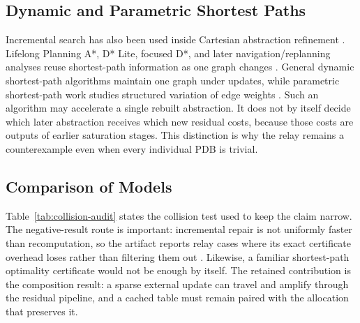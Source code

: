 \subsection{Dynamic and Parametric Shortest Paths}
Incremental search has also been used inside Cartesian abstraction refinement \citep{incremental2020}. Lifelong Planning A*, D* Lite, focused D*, and later navigation/replanning analyses reuse shortest-path information as one graph changes \citep{lpa2004,dstar2002,stentz1995,koeniglichachev2005,hernandez2012}. General dynamic shortest-path algorithms maintain one graph under updates, while parametric shortest-path work studies structured variation of edge weights \citep{ramalingam1996,frigioni2000,demetrescu2004,karporlin1981,youngtarjanorlin1991}. Such an algorithm may accelerate a single rebuilt abstraction. It does not by itself decide which later abstraction receives which new residual costs, because those costs are outputs of earlier saturation stages. This distinction is why the relay remains a counterexample even when every individual PDB is trivial.

\subsection{Comparison of Models}
Table~\ref{tab:collision-audit} states the collision test used to keep the claim narrow. The negative-result route is important: incremental repair is not uniformly faster than recomputation, so the artifact reports relay cases where its exact certificate overhead loses rather than filtering them out \citep{hernandez2012}. Likewise, a familiar shortest-path optimality certificate would not be enough by itself. The retained contribution is the composition result: a sparse external update can travel and amplify through the residual pipeline, and a cached table must remain paired with the allocation that preserves it.

